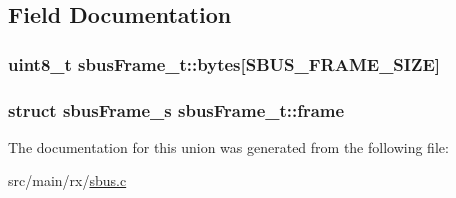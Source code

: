 \subsection{Field Documentation}
\hypertarget{unionsbusFrame__t_a4f0f33886d3b03bf1bbca2fe1ca2bc9e}{
\subsubsection[{bytes}]{\setlength{\rightskip}{0pt plus 5cm}uint8\+\_\+t sbus\+Frame\+\_\+t\+::bytes\mbox{[}{\bf S\+B\+U\+S\+\_\+\+F\+R\+A\+M\+E\+\_\+\+S\+I\+Z\+E}\mbox{]}}}\label{unionsbusFrame__t_a4f0f33886d3b03bf1bbca2fe1ca2bc9e}
\hypertarget{unionsbusFrame__t_ae77562fad30e0768066b591e7bc5e8f1}{
\subsubsection[{frame}]{\setlength{\rightskip}{0pt plus 5cm}struct {\bf sbus\+Frame\+\_\+s} sbus\+Frame\+\_\+t\+::frame}}\label{unionsbusFrame__t_ae77562fad30e0768066b591e7bc5e8f1}


The documentation for this union was generated from the following file\+:\begin{DoxyCompactItemize}
\item 
src/main/rx/\hyperlink{sbus_8c}{sbus.\+c}\end{DoxyCompactItemize}
